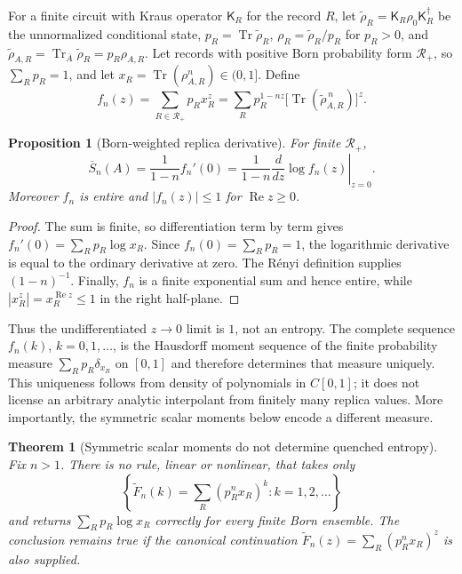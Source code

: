 \documentclass[aps,prx,reprint,superscriptaddress,nobibnotes,longbibliography]{revtex4-2}
\newtheorem{theorem}{Theorem}
\newtheorem{proposition}{Proposition}
\theoremstyle{remark}
\newcommand{\Tr}{\operatorname{Tr}}
\begin{document}
For a finite circuit with Kraus operator $\mathsf K_R$ for the record $R$, let $\tilde\rho_R=\mathsf K_R\rho_0\mathsf K_R^\dagger$ be the unnormalized conditional state, $p_R=\Tr\tilde\rho_R$, $\rho_R=\tilde\rho_R/p_R$ for $p_R>0$, and $\tilde\rho_{A,R}=\Tr_{\bar A}\tilde\rho_R=p_R\rho_{A,R}$.  Let records with positive Born probability form $\mathcal R_+$, so $\sum_Rp_R=1$, and let
$x_R=\Tr(\rho_{A,R}^n)\in(0,1]$.  Define
\begin{equation}
 f_n(z)=\sum_{R\in\mathcal R_+}p_Rx_R^z
 =\sum_Rp_R^{1-nz}\bigl[\Tr(\tilde\rho_{A,R}^{\,n})\bigr]^z.
 \label{eq:Mellin}
\end{equation}

\begin{proposition}[Born-weighted replica derivative]
\label{prop:replica-derivative}
For finite $\mathcal R_+$,
\begin{equation}
 \overline S_n(A)=\frac1{1-n}f_n'(0)
 =\frac1{1-n}\left.\frac{d}{dz}\log f_n(z)\right|_{z=0}.
 \label{eq:replicaderiv}
\end{equation}
Moreover $f_n$ is entire and $|f_n(z)|\le1$ for $\operatorname{Re}z\ge0$.
\end{proposition}

\begin{proof}
The sum is finite, so differentiation term by term gives
$f_n'(0)=\sum_Rp_R\log x_R$.  Since $f_n(0)=\sum_Rp_R=1$, the logarithmic derivative is equal to the ordinary derivative at zero.  The R\'enyi definition supplies $(1-n)^{-1}$.  Finally, $f_n$ is a finite exponential sum and hence entire, while $|x_R^z|=x_R^{\operatorname{Re}z}\le1$ in the right half-plane.
\end{proof}

Thus the undifferentiated $z\to0$ limit is $1$, not an entropy.  The complete sequence $f_n(k)$, $k=0,1,\ldots$, is the Hausdorff moment sequence of the finite probability measure $\sum_Rp_R\delta_{x_R}$ on $[0,1]$ and therefore determines that measure uniquely.  This uniqueness follows from density of polynomials in $C[0,1]$; it does not license an arbitrary analytic interpolant from finitely many replica values.  More importantly, the symmetric scalar moments below encode a different measure.

\begin{theorem}[Symmetric scalar moments do not determine quenched entropy]
\label{thm:no-go}
Fix $n>1$.  There is no rule, linear or nonlinear, that takes only
\begin{equation}
 \left\{\widetilde F_n(k)=\sum_R(p_R^nx_R)^k:k=1,2,\ldots\right\}
 \label{eq:symmdata}
\end{equation}
and returns $\sum_Rp_R\log x_R$ correctly for every finite Born ensemble.  The conclusion remains true if the canonical continuation
$\widetilde F_n(z)=\sum_R(p_R^nx_R)^z$ is also supplied.
\end{theorem}
\end{document}
